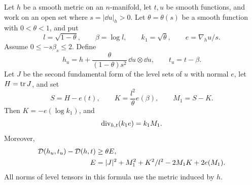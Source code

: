 \begin{lemma}\label{pre:graph-comparison}
Let $h$ be a smooth metric on an $n$-manifold, let $t,u$ be smooth
functions, and work on an open set where $s=|\dd u|_h>0$.
Let $\theta=\theta(s)$ be a smooth function with $0<\theta<1$, and put
\[
 l=\sqrt{1-\theta},\qquad \beta=\log l,
 \qquad k_1=\sqrt\theta,\qquad e=\nabla_hu/s.
\]
Assume $0\le-s\beta_s\le2$. Define
\begin{equation}\label{pre:graph-update}
 h_u=h+\frac{\theta}{(1-\theta)s^2}\,\dd u\otimes\dd u,
 \qquad t_u=t-\beta.
\end{equation}
Let $J$ be the second fundamental form of the level sets of $u$ with
normal $e$, let $H=\operatorname{tr} J$, and set
\[
 S=H-e(t),\qquad K=\frac{l^2}{\theta}e(\beta),
 \qquad M_1=S-K.
\]
Then $K=-e(\log k_1)$, and
\begin{equation}\label{pre:weighted-divergence}
 \operatorname{div}_{h,t}(k_1e)=k_1M_1.
\end{equation}
Moreover,
\begin{equation}\label{pre:scalar-comparison}
 \begin{split}
 \mathcal D(h_u,t_u)-\mathcal D(h,t)&\ge\theta E,\\
 E&=|J|^2+M_1^2+K^2/l^2-2M_1K+2e(M_1).
 \end{split}
\end{equation}
All norms of level tensors in this formula use the metric induced by $h$.
\end{lemma}

